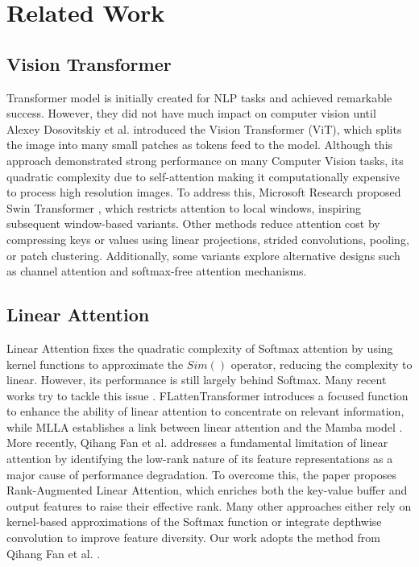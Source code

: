 \section{Related Work}
\subsection{Vision Transformer}
Transformer \cite{vaswani2017attention} model is initially created for NLP tasks and achieved remarkable success. However, they did not have much impact on computer vision until Alexey Dosovitskiy et al. \cite{rao2021dynamicvit} introduced the Vision Transformer (ViT), which splits the image into many small patches as tokens feed to the model. Although this approach demonstrated strong performance on many Computer Vision tasks, its quadratic complexity due to self-attention making it computationally expensive to process high resolution images. To address this, Microsoft Research proposed Swin Transformer \cite{liu2021swin}, which restricts attention to local windows, inspiring subsequent window-based variants. Other methods reduce attention cost by compressing keys or values using linear projections, strided convolutions, pooling, or patch clustering. Additionally, some variants explore alternative designs such as channel attention and softmax-free attention mechanisms.

\subsection{Linear Attention}
Linear Attention \cite{shen2021efficient} fixes the quadratic complexity of Softmax attention by using kernel functions to approximate the \(Sim()\) operator, reducing the complexity to linear. However, its performance is still largely behind Softmax. Many recent works try to tackle this issue \cite{cai2023efficientvit,han2023flatten,han2024demystify,katharopoulos2020transformers,lu2024softmax,shen2021efficient}.
FLattenTransformer \cite{han2023flatten} introduces a focused function to enhance the ability of linear attention to concentrate on relevant information, while MLLA \cite{han2024demystify} establishes a link between linear attention and the Mamba model \cite{gu2024mamba}.
More recently, Qihang Fan et al. \cite{fan2025breaking} addresses a fundamental limitation of linear attention by identifying the low-rank nature of its feature representations as a major cause of performance degradation. To overcome this, the paper proposes Rank-Augmented Linear Attention, which enriches both the key-value buffer and output features to raise their effective rank. Many other approaches either rely on kernel-based approximations of the Softmax function or integrate depthwise convolution to improve feature diversity. Our work adopts the method from Qihang Fan et al. \cite{fan2025breaking}.

